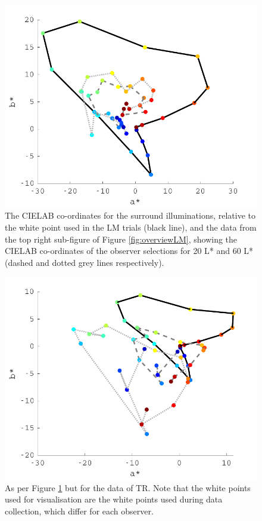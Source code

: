 \begin{figure}[htbp]
\includegraphics[max width=\textwidth]{figs/LargeSphere/LMcompareWithSurround.pdf}
\caption{The CIELAB co-ordinates for the surround illuminations, relative to the white point used in the LM trials (black line), and the data from the top right sub-figure of Figure \ref{fig:overviewLM}, showing the CIELAB co-ordinates of the observer selections for 20 L* and 60 L* (dashed and dotted grey lines respectively).}
\label{fig:LMCompSurr}
\end{figure}

\begin{figure}[htbp]
\includegraphics[max width=\textwidth]{figs/LargeSphere/TRcompareWithSurround.pdf}
\caption{As per Figure \ref{fig:LMCompSurr} but for the data of TR. Note that the white points used for visualisation are the white points used during data collection, which differ for each observer.}
\label{fig:TRCompSurr}
\end{figure}

